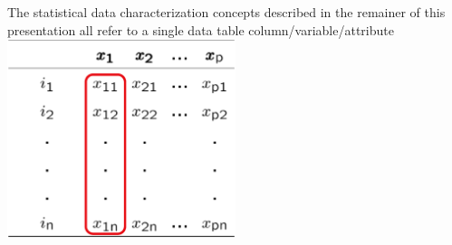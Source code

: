 \pgclrgreen
\begin{center}
{\large The statistical data characterization concepts described in the remainer of this presentation all refer to a single data table column/variable/attribute} \\
\includegraphics[width=0.5\textwidth]{table_general_one_var.eps} \\
\end{center}
\newpage


